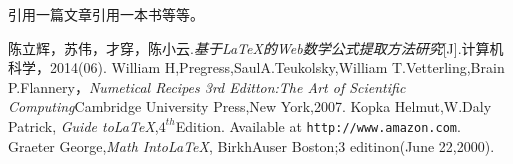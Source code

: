 \documentclass{ctexart}
\begin{document}
	引用一篇文章\cite{article1}引用一本书\cite{book1}等等。
	
	\begin{thebibliography}{99}
		陈立辉，苏伟，才穿，陈小云.\emph{基于LaTeX的Web数学公式提取方法研究}[J].计算机科学，2014(06).
		William H,Pregress,SaulA.Teukolsky,William T.Vetterling,Brain P.Flannery，\emph{Numetical Recipes 3rd Editton:The Art of Scientific Computing}Cambridge University Press,New York,2007.
		Kopka Helmut,W.Daly Patrick,
		\emph{Guide to\LaTeX},$4^{th}$Edition.
		Available at \texttt{http://www.amazon.com}.
		Graeter George,\emph{Math Into\LaTeX},
		BirkhAuser Boston;3 editinon(June 22,2000).
	\end{thebibliography}
	
\end{document}
